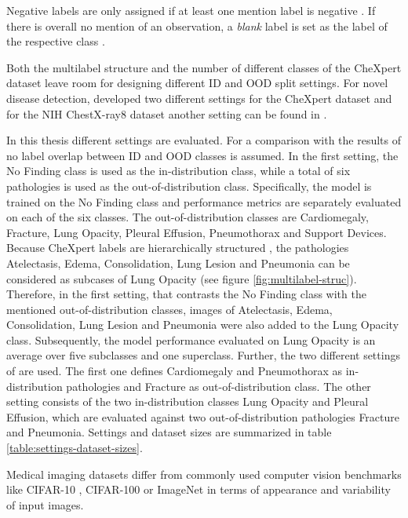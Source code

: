 Negative labels are only assigned if at least one mention label is negative \citep{Irvin2019}. 
If there is overall no mention of an observation, a \textit{blank} label is set as the label of the respective class \citep{Irvin2019}.
\par
Both the multilabel structure and the number of different classes of the CheXpert dataset leave room for designing different ID and OOD split settings.
For novel disease detection, \citep{Berger2021} developed two different settings for the CheXpert dataset and for the NIH ChestX-ray8 dataset \citep{Wang2017} another setting can be found in \citep{Cao2020}.
\par
In this thesis different settings are evaluated.
For a comparison with the results of \citep{Berger2021} no label overlap between ID and OOD classes is assumed.
In the first setting, the No Finding class is used as the in-distribution class, while a total of six pathologies is used as the out-of-distribution class.
Specifically, the model is trained on the No Finding class and performance metrics are separately evaluated on each of the six classes.
The out-of-distribution classes are Cardiomegaly, Fracture, Lung Opacity, Pleural Effusion, Pneumothorax and Support Devices.
Because CheXpert labels are hierarchically structured \cite{Irvin2019}, the pathologies Atelectasis, Edema, Consolidation, Lung Lesion and Pneumonia can be considered as subcases of Lung Opacity (see figure \ref{fig:multilabel-struc}).
Therefore, in the first setting, that contrasts the No Finding class with the mentioned out-of-distribution classes, images of Atelectasis, Edema, Consolidation, Lung Lesion and Pneumonia were also added to the Lung Opacity class.
Subsequently, the model performance evaluated on Lung Opacity is an average over five subclasses and one superclass.
Further, the two different settings of \citep{Berger2021} are used.
The first one defines Cardiomegaly and Pneumothorax as in-distribution pathologies and Fracture as out-of-distribution class.
The other setting consists of the two in-distribution classes Lung Opacity and Pleural Effusion, which are evaluated against two out-of-distribution pathologies Fracture and Pneumonia.
Settings and dataset sizes are summarized in table \ref{table:settings-dataset-sizes}.
\par
Medical imaging datasets differ from commonly used computer vision benchmarks like CIFAR-10 \citep{Krizhevsky2009a}, CIFAR-100 \citep{Krizhevsky2009b} or ImageNet \citep{Deng2009} in terms of appearance and variability of input images.
